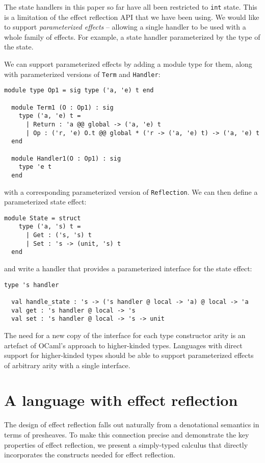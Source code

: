 \documentclass[acmsmall, screen, review, anonymous]{acmart}
\theoremstyle{definition}
\begin{document}
The state handlers in this paper so far have all been restricted to
\lstinline[style=oxcaml]{int} state. This is a limitation of the effect
reflection API that we have been using. We would like to support
\emph{parameterized effects} -- allowing a single handler to be used
with a whole family of effects. For example, a state handler
parameterized by the type of the state.

We can support parameterized effects by adding a module type for them,
along with parameterized versions of \lstinline[style=oxcaml]{Term} and
\lstinline[style=oxcaml]{Handler}:
\begin{lstlisting}[style=oxcaml]
  module type Op1 = sig type ('a, 'e) t end

  module Term1 (O : Op1) : sig
    type ('a, 'e) t =
      | Return : 'a @@ global -> ('a, 'e) t
      | Op : ('r, 'e) O.t @@ global * ('r -> ('a, 'e) t) -> ('a, 'e) t
  end

  module Handler1(O : Op1) : sig
    type 'e t
  end
\end{lstlisting}
with a corresponding parameterized version of
\lstinline[style=oxcaml]{Reflection}. We can then define a parameterized
state effect:
\begin{lstlisting}[style=oxcaml]
  module State = struct
    type ('a, 's) t =
      | Get : ('s, 's) t
      | Set : 's -> (unit, 's) t
  end
\end{lstlisting}
and write a handler that provides a parameterized interface for the
state effect:
\begin{lstlisting}[style=oxcaml]
  type 's handler

  val handle_state : 's -> ('s handler @ local -> 'a) @ local -> 'a
  val get : 's handler @ local -> 's
  val set : 's handler @ local -> 's -> unit
\end{lstlisting}

The need for a new copy of the interface for each type constructor arity
is an artefact of OCaml's approach to higher-kinded types. Languages
with direct support for higher-kinded types should be able to support
parameterized effects of arbitrary arity with a single interface.

\section{A language with effect reflection}
\label{sec:language}

The design of effect reflection falls out naturally from a denotational
semantics in terms of presheaves. To make this connection precise and
demonstrate the key properties of effect reflection, we present a
simply-typed calculus that directly incorporates the constructs needed
for effect reflection.
\end{document}
